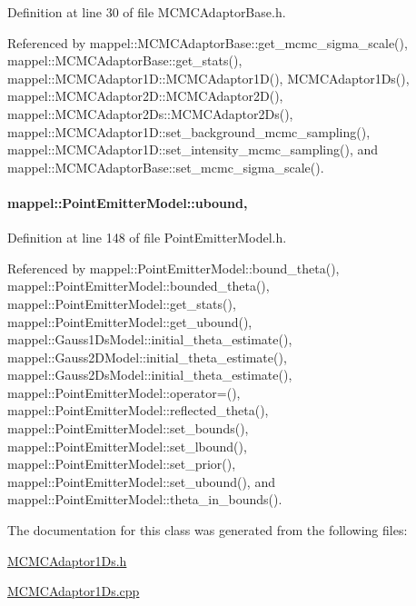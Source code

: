 Definition at line 30 of file M\+C\+M\+C\+Adaptor\+Base.\+h.



Referenced by mappel\+::\+M\+C\+M\+C\+Adaptor\+Base\+::get\+\_\+mcmc\+\_\+sigma\+\_\+scale(), mappel\+::\+M\+C\+M\+C\+Adaptor\+Base\+::get\+\_\+stats(), mappel\+::\+M\+C\+M\+C\+Adaptor1\+D\+::\+M\+C\+M\+C\+Adaptor1\+D(), M\+C\+M\+C\+Adaptor1\+Ds(), mappel\+::\+M\+C\+M\+C\+Adaptor2\+D\+::\+M\+C\+M\+C\+Adaptor2\+D(), mappel\+::\+M\+C\+M\+C\+Adaptor2\+Ds\+::\+M\+C\+M\+C\+Adaptor2\+Ds(), mappel\+::\+M\+C\+M\+C\+Adaptor1\+D\+::set\+\_\+background\+\_\+mcmc\+\_\+sampling(), mappel\+::\+M\+C\+M\+C\+Adaptor1\+D\+::set\+\_\+intensity\+\_\+mcmc\+\_\+sampling(), and mappel\+::\+M\+C\+M\+C\+Adaptor\+Base\+::set\+\_\+mcmc\+\_\+sigma\+\_\+scale().

\paragraph[{\texorpdfstring{ubound}{ubound}}]{ mappel\+::\+Point\+Emitter\+Model\+::ubound\hspace{0.3cm}{\ttfamily [protected]}, {\ttfamily [inherited]}}\hypertarget{classmappel_1_1PointEmitterModel_a35b883e84b6a2e0093bdf482c623beef}{}\label{classmappel_1_1PointEmitterModel_a35b883e84b6a2e0093bdf482c623beef}


Definition at line 148 of file Point\+Emitter\+Model.\+h.



Referenced by mappel\+::\+Point\+Emitter\+Model\+::bound\+\_\+theta(), mappel\+::\+Point\+Emitter\+Model\+::bounded\+\_\+theta(), mappel\+::\+Point\+Emitter\+Model\+::get\+\_\+stats(), mappel\+::\+Point\+Emitter\+Model\+::get\+\_\+ubound(), mappel\+::\+Gauss1\+Ds\+Model\+::initial\+\_\+theta\+\_\+estimate(), mappel\+::\+Gauss2\+D\+Model\+::initial\+\_\+theta\+\_\+estimate(), mappel\+::\+Gauss2\+Ds\+Model\+::initial\+\_\+theta\+\_\+estimate(), mappel\+::\+Point\+Emitter\+Model\+::operator=(), mappel\+::\+Point\+Emitter\+Model\+::reflected\+\_\+theta(), mappel\+::\+Point\+Emitter\+Model\+::set\+\_\+bounds(), mappel\+::\+Point\+Emitter\+Model\+::set\+\_\+lbound(), mappel\+::\+Point\+Emitter\+Model\+::set\+\_\+prior(), mappel\+::\+Point\+Emitter\+Model\+::set\+\_\+ubound(), and mappel\+::\+Point\+Emitter\+Model\+::theta\+\_\+in\+\_\+bounds().



The documentation for this class was generated from the following files\+:\begin{DoxyCompactItemize}
\item 
\hyperlink{MCMCAdaptor1Ds_8h}{M\+C\+M\+C\+Adaptor1\+Ds.\+h}\item 
\hyperlink{MCMCAdaptor1Ds_8cpp}{M\+C\+M\+C\+Adaptor1\+Ds.\+cpp}\end{DoxyCompactItemize}
